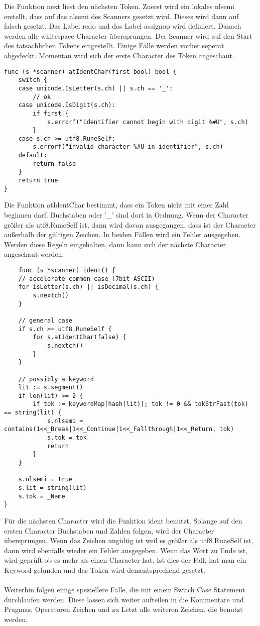 Die Funktion next liest den nächsten Token. Zuerst wird ein lokales nlsemi erstellt, dass auf das nlsemi des Scanners gesetzt wird. Dieses wird dann auf falsch gesetzt. Das Label redo und das Label assignop wird definiert. Danach werden alle whitespace Character übersprungen. Der Scanner wird auf den Start des tatsächlichen Tokens eingestellt. Einige Fälle werden vorher seperat abgedeckt. Momentan wird sich der erste Character des Token angeschaut. 
\begin{lstlisting}
func (s *scanner) atIdentChar(first bool) bool {
	switch {
	case unicode.IsLetter(s.ch) || s.ch == '_':
		// ok
	case unicode.IsDigit(s.ch):
		if first {
			s.errorf("identifier cannot begin with digit %#U", s.ch)
		}
	case s.ch >= utf8.RuneSelf:
		s.errorf("invalid character %#U in identifier", s.ch)
	default:
		return false
	}
	return true
}
\end{lstlisting}
Die Funktion atIdentChar bestimmt, dass ein Token nicht mit einer Zahl beginnen darf. Buchstaben oder '\_' sind dort in Ordnung. Wenn der Character größer als utf8.RuneSelf ist, dann wird davon ausgegangen, dass ist der Character außerhalb der gültigen Zeichen. In beiden Fällen wird ein Fehler ausgegeben. Werden diese Regeln eingehalten, dann kann sich der nächste Character angeschaut werden.
\begin{lstlisting}
    func (s *scanner) ident() {
	// accelerate common case (7bit ASCII)
	for isLetter(s.ch) || isDecimal(s.ch) {
		s.nextch()
	}

	// general case
	if s.ch >= utf8.RuneSelf {
		for s.atIdentChar(false) {
			s.nextch()
		}
	}

	// possibly a keyword
	lit := s.segment()
	if len(lit) >= 2 {
		if tok := keywordMap[hash(lit)]; tok != 0 && tokStrFast(tok) == string(lit) {
			s.nlsemi = contains(1<<_Break|1<<_Continue|1<<_Fallthrough|1<<_Return, tok)
			s.tok = tok
			return
		}
	}

	s.nlsemi = true
	s.lit = string(lit)
	s.tok = _Name
}
\end{lstlisting}
Für die nächsten Character wird die Funktion ident benutzt. Solange auf den ersten Character Buchstaben und Zahlen folgen, wird der Character übersprungen. Wenn das Zeichen ungültig ist weil es größer als utf8.RuneSelf ist, dann wird ebenfalls wieder ein Fehler ausgegeben. 
Wenn das Wort zu Ende ist, wird geprüft ob es mehr als einen Character hat. Ist dies der Fall, hat man ein Keyword gefunden und das Token wird dementsprechend gesetzt.\\
\\Weiterhin folgen einige speziellere Fälle, die mit einem Switch Case Statement durchlaufen werden. Diese lassen sich weiter aufteilen in die Kommentare und Pragmas, Operatoren Zeichen und zu Letzt alle weiteren Zeichen, die benutzt werden.  
